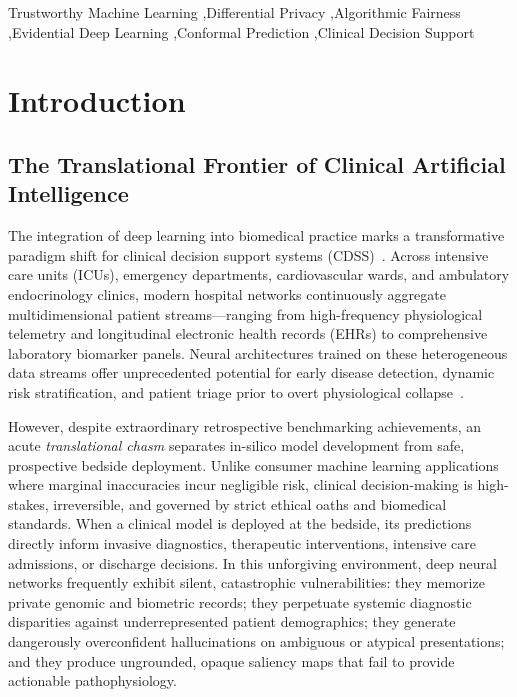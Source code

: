 \documentclass[3p,12pt]{elsarticle}
\theoremstyle{plain}
\theoremstyle{definition}
\begin{document}
\begin{frontmatter}
\begin{abstract}
\end{abstract}

\begin{keyword}
Trustworthy Machine Learning \sep Differential Privacy \sep Algorithmic Fairness \sep Evidential Deep Learning \sep Conformal Prediction \sep Clinical Decision Support
\end{keyword}

\end{frontmatter}

\section{Introduction}
\label{sec:intro}

\subsection{The Translational Frontier of Clinical Artificial Intelligence}
The integration of deep learning into biomedical practice marks a transformative paradigm shift for clinical decision support systems (CDSS)~\cite{topol2019high,rajkomar2018ensuring,kelly2019key}. Across intensive care units (ICUs), emergency departments, cardiovascular wards, and ambulatory endocrinology clinics, modern hospital networks continuously aggregate multidimensional patient streams---ranging from high-frequency physiological telemetry and longitudinal electronic health records (EHRs) to comprehensive laboratory biomarker panels. Neural architectures trained on these heterogeneous data streams offer unprecedented potential for early disease detection, dynamic risk stratification, and patient triage prior to overt physiological collapse~\cite{rajkomar2018ensuring,kompa2021second}.

However, despite extraordinary retrospective benchmarking achievements, an acute \emph{translational chasm} separates in-silico model development from safe, prospective bedside deployment. Unlike consumer machine learning applications where marginal inaccuracies incur negligible risk, clinical decision-making is high-stakes, irreversible, and governed by strict ethical oaths and biomedical standards. When a clinical model is deployed at the bedside, its predictions directly inform invasive diagnostics, therapeutic interventions, intensive care admissions, or discharge decisions. In this unforgiving environment, deep neural networks frequently exhibit silent, catastrophic vulnerabilities: they memorize private genomic and biometric records; they perpetuate systemic diagnostic disparities against underrepresented patient demographics; they generate dangerously overconfident hallucinations on ambiguous or atypical presentations; and they produce ungrounded, opaque saliency maps that fail to provide actionable pathophysiology.
\end{document}
